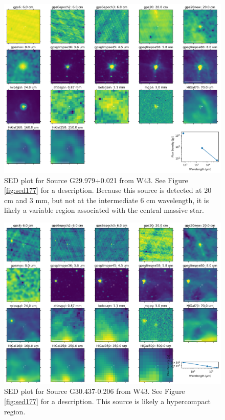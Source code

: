 \documentclass[twocolumn]{aastex62}
\begin{document}
\begin{figure}[htp]
    \includegraphics[width=17cm]{figures/SED_plot_G031_22.png}
\caption{SED plot for Source G29.979+0.021 from W43.  See Figure \ref{fig:sed177} for a description.
Because this source is detected at 20 cm and 3 mm, but not at the intermediate 6 cm wavelength,
it is likely a variable \hii region associated with the central massive star.
}
\label{fig:sed22}
\end{figure}


\begin{figure}[htp]
    \includegraphics[width=17cm]{figures/SED_plot_G031_83.png}
    \caption{SED plot for Source G30.437-0.206 from W43.  See Figure \ref{fig:sed177} for a description.
    This source is likely a hypercompact \hii region.}
\label{fig:sed83}
\end{figure}


\end{document}
